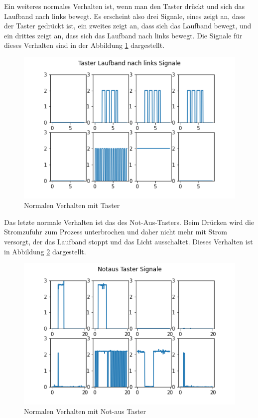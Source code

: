 \documentclass[12pt,a4paper]{scrartcl}
\numberwithin{equation}{section}
\begin{document}
Ein weiteres normales Verhalten ist, wenn man den Taster drückt und sich das Laufband nach links bewegt. Es erscheint also drei Signale, eines zeigt an, dass der Taster gedrückt ist, ein zweites zeigt an, dass sich das Laufband bewegt, und ein drittes zeigt an, dass sich das Laufband nach links bewegt. Die Signale für dieses Verhalten sind in der Abbildung \ref{taster_verhalten} dargestellt. 

\begin{figure}[ht!]
	\centering
	  \includegraphics[scale=0.5]{taster_regroup.png}
	  \caption{Normalen Verhalten mit Taster}
	\label{taster_verhalten}
\end{figure}

Das letzte normale Verhalten ist das des Not-Aus-Tasters. Beim Drücken wird die Stromzufuhr zum Prozess unterbrochen und daher nicht mehr mit Strom versorgt, der das Laufband stoppt und das Licht ausschaltet. Dieses Verhalten ist in Abbildung \ref{notaustaster} dargestellt. \\

\begin{figure}[ht!]
	\centering
	  \includegraphics[scale=0.5]{notaustaster.png}
	  \caption{Normalen Verhalten mit Not-aus Taster}
	\label{notaustaster}
\end{figure}
\end{document}
